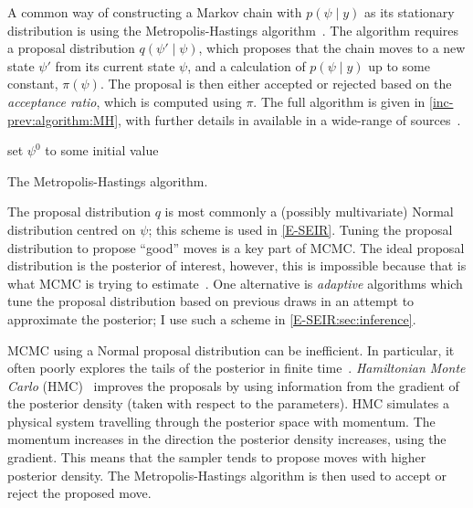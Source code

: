 \documentclass[thesis.tex]{subfiles}
\begin{document}
A common way of constructing a Markov chain with $p(\psi \mid y)$ as its stationary distribution is using the Metropolis-Hastings algorithm~\autocite{hastingsMCMC}.
The algorithm requires a proposal distribution $q(\psi' \mid \psi)$, which proposes that the chain moves to a new state $\psi'$ from its current state $\psi$, and a calculation of $p(\psi \mid y)$ up to some constant, $\pi(\psi)$.
The proposal is then either accepted or rejected based on the \emph{acceptance ratio}, which is computed using $\pi$.
The full algorithm is given in \cref{inc-prev:algorithm:MH}, with further details in available in a wide-range of sources~\autocites[e.g.][]{brooksMCMCNotes}[chapter 11]{gelmanBDA}.
\begin{algorithm}
 set $\psi^0$ to some initial value\;
 \caption{The Metropolis-Hastings algorithm.}
 \label{inc-prev:algorithm:MH}
\end{algorithm}

The proposal distribution $q$ is most commonly a (possibly multivariate) Normal distribution centred on $\psi$; this scheme is used in \cref{E-SEIR}.
Tuning the proposal distribution to propose ``good'' moves is a key part of MCMC.
The ideal proposal distribution is the posterior of interest, however, this is impossible because that is what MCMC is trying to estimate~\autocite[296]{gelmanBDA}.
One alternative is \emph{adaptive} algorithms which tune the proposal distribution based on previous draws in an attempt to approximate the posterior; I use such a scheme in \cref{E-SEIR:sec:inference}.

MCMC using a Normal proposal distribution can be inefficient.
In particular, it often poorly explores the tails of the posterior in finite time~\autocite[e.g.][]{turitsynIrreversible}.
\emph{Hamiltonian Monte Carlo} (HMC)~\autocites{nealMCMC}{nealImproved}{duaneHybrid} improves the proposals by using information from the gradient of the posterior density (taken with respect to the parameters).
HMC simulates a physical system travelling through the posterior space with momentum.
The momentum increases in the direction the posterior density increases, using the gradient.
This means that the sampler tends to propose moves with higher posterior density.
The Metropolis-Hastings algorithm is then used to accept or reject the proposed move.
\end{document}
